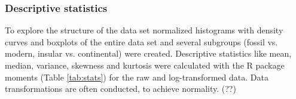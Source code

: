 



\subsubsection{Descriptive statistics}
To explore the structure of the data set normalized histograms with density curves and boxplots of the entire data set and several subgroups (fossil vs. modern, insular vs. continental) were created. Descriptive statistics like mean, median, variance, skewness and kurtosis were calculated with the R package moments \citep{Komsta2015}  (Table \ref{tab:stats}) for the raw and log-transformed data. Data transformations are often conducted, to achieve normality. (??)

